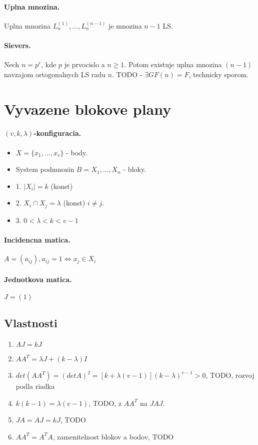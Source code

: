 \documentclass[10pt,a4paper]{article}
\begin{document}
\paragraph{Uplna mnozina.}
Uplna mnozina $L_n^{(1)}, \ldots ,L_n^{(n-1)}$ je mnozina $n-1$ LS.

\paragraph{Sievers.}
Nech $n=p^r$, kde $p$ je prvocislo a $n \geq 1$. Potom existuje uplna mnozina $(n-1)$ navzajom ortogonalnych LS radu $n$.
TODO - $\exists GF(n) = F$, technicky sporom. 

\section{Vyvazene blokove plany}
\paragraph{$(v,k,\lambda)$-konfiguracia.}
\begin{itemize}
\item $X = \{x_1, \ldots, x_v\}$ - body.
\item System podmnozin $B = {X_1, \ldots, X_n}$ - bloky. 
\item 1. $|X_i|=k$ (konst)
\item 2. $X_i \cap X_j = \lambda$ (konst) $i \neq j$.
\item 3. $0 < \lambda < k < v-1$
\end{itemize}
\paragraph{Incidencna matica.}
$A=(a_{ij}), a_{ij} = 1 \Leftrightarrow x_j \in X_i$
\paragraph{Jednotkova matica.}
$J=(1)$
\subsection{Vlastnosti}
\begin{enumerate}
\item $AJ = kJ$
\item $AA^T = \lambda J + (k-\lambda)I$
\item $det(AA^T)=(det A)^2=[k + \lambda(v-1)](k-\lambda)^{v-1} > 0$, TODO, rozvoj podla riadka
\item $k(k-1) = \lambda(v-1)$, TODO, z $AA^T$ na $JAJ$. 
\item $JA=AJ=kJ$, TODO
\item $AA^T=A^TA$, zamenitelnost blokov a bodov, TODO
\end{enumerate}
\end{document}
